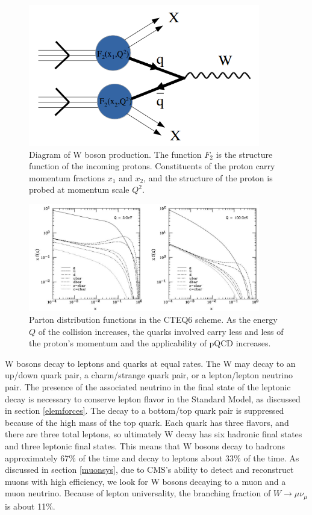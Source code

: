 \documentclass[oneside, letterpaper, oldfontcommands]{memoir}
\begin{document}
\begin{figure}[here]
\includegraphics[width=0.9\textwidth]{WFormation.png}
\caption{Diagram of W boson production. The function $F_{2}$ is the structure function of the incoming protons. Constituents of the proton carry momentum fractions $x_{1}$ and $x_{2}$, and the structure of the proton is probed at momentum scale $Q^{2}$.}
\label{fig:WFormation}
\end{figure}

\begin{figure}[here]
\includegraphics[width=0.9\textwidth]{cteq6PDF.jpg}
\caption{Parton distribution functions in the CTEQ6 scheme\cite{Pumplin:2002vw}. As the energy $Q$ of the collision increases, the quarks involved carry less and less of the proton's momentum and the applicability of pQCD increases.}
\label{fig:cteq6PDF}
\end{figure}

\qquad W bosons decay to leptons and quarks at equal rates. The W may decay to an up/down quark pair, a charm/strange quark pair, or a lepton/lepton neutrino pair. The presence of the associated neutrino in the final state of the leptonic decay is necessary to conserve lepton flavor in the Standard Model, as discussed in section \ref{elemforces}.  The decay to a bottom/top quark pair is suppressed because of the high mass of the top quark. Each quark has three flavors, and there are three total leptons, so ultimately W decay has six hadronic final states and three leptonic final states. This means that W bosons decay to hadrons approximately 67$\%$ of the time and decay to leptons about $33\%$ of the time. As discussed in section \ref{muonsys}, due to CMS's ability to detect and reconstruct muons with high efficiency, we look for W bosons decaying to a muon and a muon neutrino. Because of lepton universality, the branching fraction of $W \rightarrow \mu\nu_{\mu}$ is about 11$\%$. 
\end{document}
